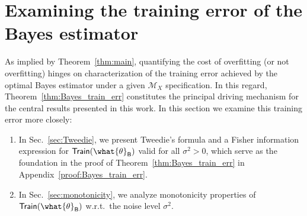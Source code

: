 \documentclass[11pt]{article}
\newcommand{\bysest}{\what{\theta}_{\mathsf{B}}}
\newcommand{\trerr}{\mathsf{Train}}
\newcommand{\model}{\mathscr{M}}
\begin{document}
%

\section{Examining the training error of the Bayes estimator} \label{sec:fine-grained}
As implied by Theorem~\ref{thm:main}, quantifying the cost of overfitting (or not overfitting) hinges on characterization of the training error achieved by the optimal Bayes estimator under a given $\model_X$ specification. In this regard, Theorem~\ref{thm:Bayes_train_err} constitutes the principal driving mechanism for the central results presented in this work. 
In this section we examine this training error more closely:
\begin{enumerate}
    \item In Sec.~\ref{sec:Tweedie}, we present Tweedie's formula and a Fisher information expression for $\trerr(\bysest)$ valid for all $\sigma^2 > 0$, which serve as the foundation in the proof of Theorem~\ref{thm:Bayes_train_err} in Appendix~\ref{proof:Bayes_train_err}.
    \item In Sec.~\ref{sec:monotonicity}, we analyze monotonicity properties of $\trerr(\bysest)$ w.r.t.\ the noise level $\sigma^2$.
\end{enumerate} 
\end{document}
